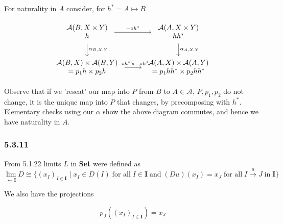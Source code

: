\documentclass{article}
\begin{document}
For naturality in $A$ consider, for $h^* = A \mapsto B$

\begin{equation}
  \label{eqn:5393}
  \begin{tikzcd}
    \begin{array}{c}
      \mathcal{A}(B, X \times Y) \\
      h
    \end{array}
    \arrow[r, "\mathit{-} \circ h^*"] \arrow[d, "\alpha_{B,X,Y}"]
    &
    \begin{array}{c}
      \mathcal{A}(A, X \times Y) \\
      hh^*
    \end{array}
    \arrow[d, "\alpha_{A,X,Y}"]\\
    \begin{array}{c}
      \mathcal{A}(B,X) \times \mathcal{A}(B,Y) \\
      = p_1h \times p_2h
     \end{array}
    \arrow[r, "\;\mathit{-} \circ h^* \times \mathit{-} \circ h^*\;"]
    &
    \begin{array}{c}
      \mathcal{A}(A,X) \times \mathcal{A}(A,Y) \\
      = p_1hh^* \times p_2hh^*
    \end{array}
  \end{tikzcd}
\end{equation}

Observe that if we 'reseat' our map into $P$ from $B$ to $A \in \mathcal{A}$, $P, p_1, p_2$ do not change, it is the unique map into $P$ that changes, by precomposing with $h^*$. Elementary checks using our $\alpha$ show the above diagram commutes, and hence we have naturality in $A$.

\subsubsection*{5.3.11}
From 5.1.22 limits $L$ in \textbf{Set} were defined as
\begin{equation}
  \label{5311:eqn1}
  \lim_{\leftarrow \mathbf{I}} D \cong \{(x_I)_{I \in \mathbf{I}} \mid x_I \in D(I) \; \text{for all} \; I \in \mathbf{I} \; \text{and} \; (Du)(x_I)=x_J \; \text{for all} \; I \xrightarrow{u} J \; \text{in} \; \mathbf{I}\}
\end{equation}

We also have the projections

\begin{equation}
  \label{5311:eqn2}
  p_J((x_I)_{I \in \mathbf{I}}) = x_J
\end{equation}
\end{document}
